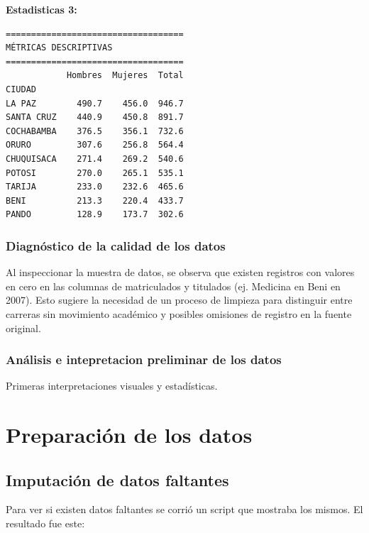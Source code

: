 \documentclass[10pt, twocolumn]{article}
\begin{document}
\textbf{Estadisticas 3:}

\begin{verbatim}
===================================
MÉTRICAS DESCRIPTIVAS
===================================
            Hombres  Mujeres  Total
CIUDAD                             
LA PAZ        490.7    456.0  946.7
SANTA CRUZ    440.9    450.8  891.7
COCHABAMBA    376.5    356.1  732.6
ORURO         307.6    256.8  564.4
CHUQUISACA    271.4    269.2  540.6
POTOSI        270.0    265.1  535.1
TARIJA        233.0    232.6  465.6
BENI          213.3    220.4  433.7
PANDO         128.9    173.7  302.6
\end{verbatim}

\subsubsection{Diagnóstico de la calidad de los datos}

Al inspeccionar la muestra de datos, se observa que existen registros con valores en cero en las columnas de matriculados y titulados (ej. Medicina en Beni en 2007). Esto sugiere la necesidad de un proceso de limpieza para distinguir entre carreras sin movimiento académico y posibles omisiones de registro en la fuente original.

\subsubsection{Análisis e intepretacion preliminar de los datos}

Primeras interpretaciones visuales y estadísticas.

\lipsum[1][1]

\section{Preparación de los datos}

\subsection{Imputación de datos faltantes}

Para ver si existen datos faltantes se corrió un script que mostraba los mismos. El resultado fue este:
\end{document}

